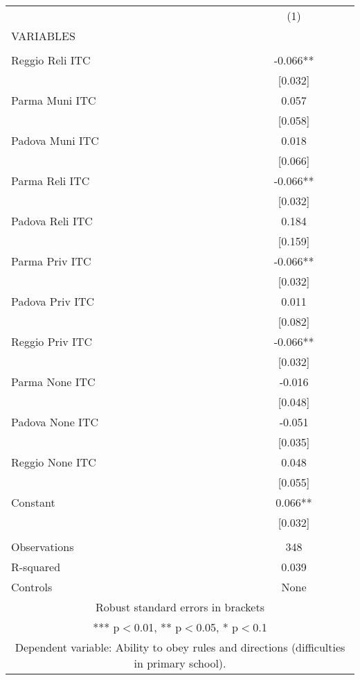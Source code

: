 \begin{tabular}{lc} \hline
 & (1) \\
VARIABLES &  \\ \hline
 &  \\
Reggio Reli ITC & -0.066** \\
 & [0.032] \\
Parma Muni ITC & 0.057 \\
 & [0.058] \\
Padova Muni ITC & 0.018 \\
 & [0.066] \\
Parma Reli ITC & -0.066** \\
 & [0.032] \\
Padova Reli ITC & 0.184 \\
 & [0.159] \\
Parma Priv ITC & -0.066** \\
 & [0.032] \\
Padova Priv ITC & 0.011 \\
 & [0.082] \\
Reggio Priv ITC & -0.066** \\
 & [0.032] \\
Parma None ITC & -0.016 \\
 & [0.048] \\
Padova None ITC & -0.051 \\
 & [0.035] \\
Reggio None ITC & 0.048 \\
 & [0.055] \\
Constant & 0.066** \\
 & [0.032] \\
 &  \\
Observations & 348 \\
R-squared & 0.039 \\
 Controls & None \\ \hline
\multicolumn{2}{c}{ Robust standard errors in brackets} \\
\multicolumn{2}{c}{ *** p$<$0.01, ** p$<$0.05, * p$<$0.1} \\
\multicolumn{2}{c}{ Dependent variable: Ability to obey rules and directions (difficulties in primary school).} \\
\end{tabular}
